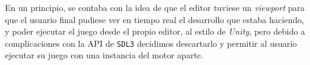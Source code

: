 \medskip

En un principio, se contaba con la idea de que el editor tuviese un \textit{viewport} para que el usuario final pudiese ver en tiempo real el desarrollo que estaba haciendo, y poder ejecutar el juego desde el propio editor, al estilo de \textit{Unity}, pero debido a complicaciones con la API de \texttt{SDL3} decidimos descartarlo y permitir al usuario ejecutar su juego con una instancia del motor aparte.
